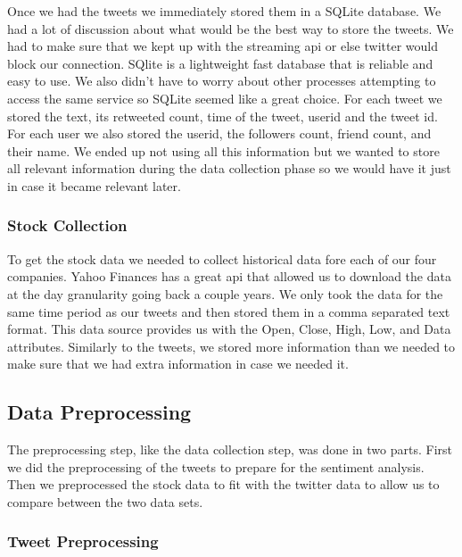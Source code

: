 \documentclass{acm_proc_article-sp}
\begin{document}
Once we had the tweets we immediately stored them in a SQLite database.  We had
a lot of discussion about what would be the best way to store the tweets. We
had to make sure that we kept up with the streaming api or else twitter would
block our connection. SQlite is a lightweight fast database that is reliable
and easy to use. We also didn't have to worry about other processes attempting
to access the same service so SQLite seemed like a great choice. For each tweet
we stored the text, its retweeted count, time of the tweet, userid and the
tweet id. For each user we also stored the userid, the followers count, friend
count, and their name. We ended up not using all this information but we wanted
to store all relevant information during the data collection phase so we would
have it just in case it became relevant later. 

\subsubsection{Stock Collection} 

To get the stock data we needed to collect historical data fore each of our
four companies. Yahoo Finances has a great api that allowed us to download the
data at the day granularity going back a couple years. We only took the data
for the same time period as our tweets and then stored them in a comma
separated text format.  This data source provides us with the Open, Close,
High, Low, and Data attributes. Similarly to the tweets, we stored more
information than we needed to make sure that we had extra information in case
we needed it. 

\subsection{Data Preprocessing}

The preprocessing step, like the data collection step, was done in two parts.
First we did the preprocessing of the tweets to prepare for the sentiment analysis.
Then we preprocessed the stock data to fit with the twitter data to allow us to 
compare between the two data sets.

\subsubsection{Tweet Preprocessing}
\end{document}

